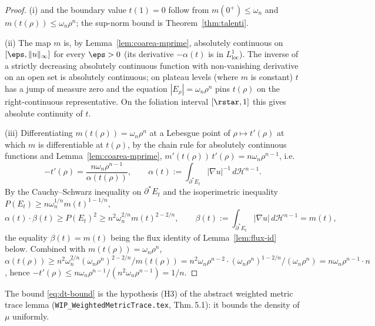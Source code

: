 \begin{proof}
(i) and the boundary value $t(1)=0$ follow from $m(0^+)\le\omega_n$
and $m(t(\rho))\le\omega_n\rho^n$; the sup-norm bound is
Theorem~\ref{thm:talenti}.

(ii) The map $m$ is, by Lemma~\ref{lem:coarea-mprime}, absolutely
continuous on $[\eps,\|u\|_\infty]$ for every $\eps>0$ (its derivative
$-\alpha(t)$ is in $L^1_{\mathrm{loc}}$). The inverse of a strictly
decreasing absolutely continuous function with non-vanishing
derivative on an open set is absolutely continuous; on plateau
levels (where $m$ is constant) $t$ has a jump of measure zero and
the equation $|E_\rho|=\omega_n\rho^n$ pins $t(\rho)$ on the
right-continuous representative. On the foliation interval
$[\rstar,1]$ this gives absolute continuity of $t$.

(iii) Differentiating $m(t(\rho))=\omega_n\rho^n$ at a Lebesgue point
of $\rho\mapsto t'(\rho)$ at which $m$ is differentiable at
$t(\rho)$, by the chain rule for absolutely continuous functions and
Lemma~\ref{lem:coarea-mprime},
$m'(t(\rho))\,t'(\rho)=n\omega_n\rho^{n-1}$, i.e.\
\begin{equation}\label{eq:tprime-formula}
   -t'(\rho)=\frac{n\omega_n\rho^{n-1}}{\alpha(t(\rho))},
   \qquad\alpha(t):=\!\int_{\partial^*E_t}\!|\nabla u|^{-1}\,d\mathcal H^{n-1}.
\end{equation}
By the Cauchy--Schwarz inequality on $\partial^*E_t$ and the
isoperimetric inequality $P(E_t)\ge n\omega_n^{1/n}m(t)^{1-1/n}$,
\begin{equation}\label{eq:alpha-LB}
   \alpha(t)\cdot\beta(t)\ge P(E_t)^2\ge n^2\omega_n^{2/n}m(t)^{2-2/n},
   \qquad
   \beta(t):=\!\int_{\partial^*E_t}\!|\nabla u|\,d\mathcal H^{n-1}=m(t),
\end{equation}
the equality $\beta(t)=m(t)$ being the flux identity of
Lemma~\ref{lem:flux-id} below. Combined with $m(t(\rho))=\omega_n\rho^n$,
$\alpha(t(\rho))\ge n^2\omega_n^{2/n}(\omega_n\rho^n)^{2-2/n}/m(t(\rho))
=n^2\omega_n\rho^{n-2}\cdot(\omega_n\rho^n)^{1-2/n}/(\omega_n\rho^n)
=n\omega_n\rho^{n-1}\cdot n$, hence
$-t'(\rho)\le n\omega_n\rho^{n-1}/(n^2\omega_n\rho^{n-1})=1/n$.
\end{proof}

\begin{remark}
\label{rem:H3}
The bound \eqref{eq:dt-bound} is the hypothesis (H3) of the abstract
weighted metric trace lemma (\texttt{WIP\_WeightedMetricTrace.tex},
Thm.\,5.1): it bounds the density of $\mu$ uniformly.
\end{remark}

